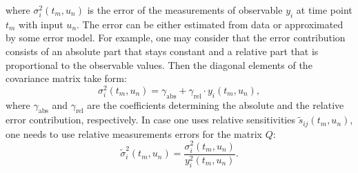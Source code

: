 \documentclass[graybox]{svmult}
\begin{document}
where $\sigma_{i}^2 (t_m, u_n)$ is the error of the measurements of observable $y_i$ at time point $t_m$ with input $u_n$.
The error can be either estimated from data or approximated by some error model.
For example, one may consider that the error contribution consists of an absolute part that stays constant and a relative part that is proportional to the observable values.
Then the diagonal elements of the covariance matrix take form:
\begin{equation}
\label{eq:error_model}
    \sigma_{i}^2 (t_m, u_n) = \gamma_\text{abs} + \gamma_\text{rel} \cdot y_i(t_m, u_n),
\end{equation}
where $\gamma_\text{abs}$ and $\gamma_\text{rel}$ are the coefficients determining the absolute and the relative error contribution, respectively.
In case one uses relative sensitivities $\tilde{s}_{ij} (t_m, u_n)$, one needs to use relative measurements errors for the matrix $Q$:
\begin{equation}
    \tilde{\sigma}_{i}^2 (t_m, u_n) = \frac{\sigma_{i}^2 (t_m, u_n)}{y^2_i(t_m, u_n)}.
\end{equation}
%
\end{document}

